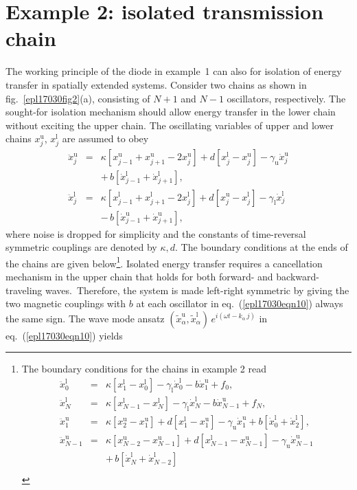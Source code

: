 \documentclass[doublecol,final,edchoice]{epl2}
\begin{document}
\section{Example 2: isolated transmission chain}

The working principle of the diode in example~1 can also  for isolation of energy transfer in spatially extended systems. Consider two chains as shown in fig.~\ref{epl17030fig2}(a), consisting of $N+1$ and $N-1$ oscillators, respectively. The sought-for isolation mechanism should allow energy transfer in the lower chain without exciting the upper chain. The oscillating variables of upper and lower chains $x^{\text{u}}_{j}$, $x^{\text{l}}_{j}$ are assumed to obey
\begin{eqnarray}%
\ddot{x}^{\text{u}}_{j}&=&\kappa \left[x^{\text{u}}_{j-1}+x^{\text{u}}_{j+1}-2 x^{\text{u}}_{j} \right] + d \left[x^{\text{l}}_{j}-x^{\text{u}}_{j}\right] -\gamma_{\text{u}} \dot{x}^{\text{u}}_j\nonumber\\
&& +\, b\left[\dot{x}^{\text{l}}_{j-1}+\dot{x}^{\text{l}}_{j+1}\right],\nonumber\\
\ddot{x}^{\text{l}}_{j}&=&\kappa\left[x^{\text{l}}_{j-1}+x^{\text{l}}_{j+1}-2 x^{\text{l}}_{j}\right] + d \left[x^{\text{u}}_{j}-x^{\text{l}}_{j}\right]-\gamma_{\text{l}}\dot{x}^{\text{l}}_{j}\nonumber\\
&&-\, b\left[\dot{x}^{\text{u}}_{j-1}+\dot{x}^{\text{u}}_{j+1}\right],\label{epl17030eqn10}
\end{eqnarray}
where noise is dropped for simplicity and the constants of time-reversal symmetric couplings are denoted by $\kappa, d$. The boundary conditions at the ends of the chains are given below\footnote{The boundary conditions for the chains in example 2 read
\begin{eqnarray*}
\ddot{x}^{\text{l}}_0&=&\kappa [x^{\text{l}}_1- x^{\text{l}}_0] -\gamma_{\text{l}} \dot{x}^{\text{l}}_0 - b \dot{x}^{\text{u}}_1 + f_0,\\[2.5pt]
\ddot{x}^{\text{l}}_N &=&\kappa [x^{\text{l}}_{N-1}- x^{\text{l}}_N] -\gamma_{\text{l}} \dot{x}^{\text{l}}_N - b \dot{x}^{\text{u}}_{N-1} + f_N,\\[2.5pt]
\ddot{x}^{\text{u}}_1 &=&\kappa [x^{\text{u}}_2- x^{\text{u}}_1] + d [x^{\text{l}}_1-x^{\text{u}}_1] -\gamma_{\text{u}} \dot{x}^{\text{u}}_1 +b [\dot{x}^{\text{l}}_0+\dot{x}^{\text{l}}_2],\\[2.5pt]
\ddot{x}^{\text{u}}_{N-1} &=&\kappa [x^{\text{u}}_{N-2}- x^{\text{u}}_{N-1}] + d [x^{\text{l}}_{N-1}-x^{\text{u}}_{N-1}] -\gamma_{\text{u}} \dot{x}^{\text{u}}_{N-1}\\[2.5pt]
&&+\,b [\dot{x}^{\text{l}}_{N}+\dot{x}^{\text{l}}_{N-2}]\\[-1.7pc]
\end{eqnarray*}}. Isolated energy transfer requires a cancellation mechanism in the upper chain that holds for both forward- and backward-traveling waves.~Therefore, the system is made left-right symmetric by giving the two magnetic couplings with $b$ at each oscillator in eq.~(\ref{epl17030eqn10}) always the same sign. The wave mode ansatz $(\tilde{x}^{\text{u}}_{\alpha},\tilde{x}^{\text{l}}_{\alpha})\,e^{i(\omega t - k_{\alpha}\,j)}$ in eq.~(\ref{epl17030eqn10}) yields
\end{document}
